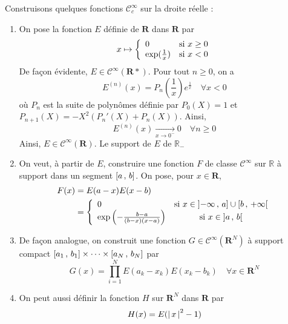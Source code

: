         Construisons quelques fonctions $\mathcal{C}_c^{\infty}$ sur la droite réelle : 
        \begin{enumerate}
            \item On pose la fonction $E$ définie de $\mathbf{R}$ dans $\mathbf{R}$ par 
            \[ x \mapsto \left\{      \begin{array}{lc}
                0 & \text{si } x \geq 0 \\
                \exp(\frac{1}{x}) & \text{si } x < 0
            \end{array} \right. \kern-\nulldelimiterspace \]   
            De façon évidente, $E \in \mathcal{C}^{\infty}(\mathbf{R}*)$. Pour tout $n \geq 0$, on a 
            \[ E^{(n)}(x) = P_n\left(\frac{1}{x}\right)e^{\frac{1}{x}} \quad \forall x < 0 \] 
            où $P_n$ est la suite de polynômes définie par $P_0(X) = 1$ et $P_{n+1}(X) = - X^2(P_n'(X) + P_n(X))$. Ainsi, 
            \[ E^{(n)}(x) \underset{x \to 0^-}{\longrightarrow} 0 \quad \forall n \geq 0 \]  
            Ainsi, $E \in \mathcal{C}^{\infty}(\mathbf{R})$. Le support de $E$ de $\mathbb{R}_-$
            \item On veut, à partir de $E$, construire une fonction $F$ de classe $\mathcal{C}^{\infty}$ sur $\mathbb{R}$ à support dans un segment $\left[ a \, , \, b \right]$. On pose, pour $x \in \mathbf{R}$,
            \begin{align*}
                F(x) 
                &= E(a-x)E(x-b) \\
                &= \left\{      \begin{array}{lc}
                0 & \text{si } x \in \intOF{-\infty}{a} \cup \intFO{b}{+\infty} \\
                \exp\left(-\frac{b-a}{(b-x)(x-a)}\right) & \text{si } x \in \intOO{a}{b}
            \end{array} \right. \kern-\nulldelimiterspace 
            \end{align*}
            \item De façon analogue, on construit une fonction $G \in \mathcal{C}^{\infty}(\mathbf{R}^N)$ à support compact $\left[ a_1 \, , \, b_1 \right] \times \cdots \times \left[ a_N \, , \, b_N \right]$ par 
            \[ G(x) = \prod_{i=1}^{N} E(a_k - x_k)E(x_k - b_k) \quad \forall x \in \mathbf{R}^N \] 
            \item On peut aussi définir la fonction $H$ sur $\mathbf{R}^N$ dans $\mathbf{R}$ par 
            \begin{align*}
                H(x)
                &= E(\abs{x}^2 - 1) \\

\end{align*}
\end{enumerate}
